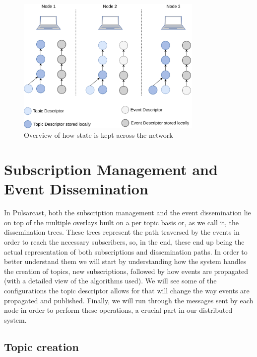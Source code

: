 \begin{figure}[hb!]
  \centering
  \includegraphics[width=0.8\textwidth]{../images/pulsarcast-local-vs-distributed-state.png}
  \caption{Overview of how state is kept across the network}
  \label{fig:pulsarcast-local-vs-distributed-state}
\end{figure}

\section{Subscription Management and Event Dissemination}\label{subscription-management-event-dissemination}

In Pulsarcast, both the subscription management and the event dissemination lie
on top of the multiple overlays built on a per topic basis or, as we call it,
the dissemination trees. These trees represent the path traversed by the events
in order to reach the necessary subscribers, so, in the end, these end up being
the actual representation of both subscriptions and dissemination paths. In
order to better understand them we will start by understanding how the system
handles the creation of topics, new subscriptions, followed by how events are
propagated (with a detailed view of the algorithms used). We will see some of
the configurations the topic descriptor allows for that will change the way
events are propagated and published. Finally, we will run through the messages
sent by each node in order to perform these operations, a crucial part in our
distributed system.

\subsection{Topic creation}\label{subsec:topic-creation}

